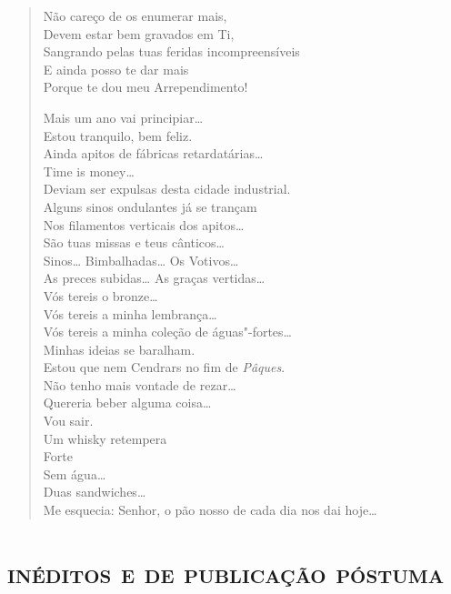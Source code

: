 \begin{verse}
Não careço de os enumerar mais,\\
Devem estar bem gravados em Ti,\\
Sangrando pelas tuas feridas incompreensíveis\\
E ainda posso te dar mais\\
Porque te dou meu Arrependimento!

Mais um ano vai principiar\ldots{}\\
Estou tranquilo, bem feliz.\\
Ainda apitos de fábricas retardatárias\ldots{}\\
\qquad\qquad\qquad\qquad\quad Time is money\ldots{}\\
\qquad Deviam ser expulsas desta cidade industrial.\\
Alguns sinos ondulantes já se trançam\\
Nos filamentos verticais dos apitos\ldots{}\\
São tuas missas e teus cânticos\ldots{}\\
Sinos\ldots{} Bimbalhadas\ldots{} Os Votivos\ldots{}\\
As preces subidas\ldots{} As graças vertidas\ldots{}\\
Vós tereis o bronze\ldots{}\\
\qquad Vós tereis a minha lembrança\ldots{}\\
\qquad\qquad Vós tereis a minha coleção de águas"-fortes\ldots{}\\
Minhas ideias se baralham.\\
Estou que nem Cendrars no fim de \emph{Pâques}.\\
Não tenho mais vontade de rezar\ldots{}\\
Quereria beber alguma coisa\ldots{}\\
Vou sair.\\
Um whisky retempera\\
\qquad Forte\\
\qquad Sem água\ldots{}\\
Duas sandwiches\ldots{}\\
Me esquecia: Senhor, o pão nosso de cada dia nos dai hoje\ldots{}
\end{verse}

\movetooddpage
{}
\part*{\textsc{inéditos e de publicação póstuma}}

